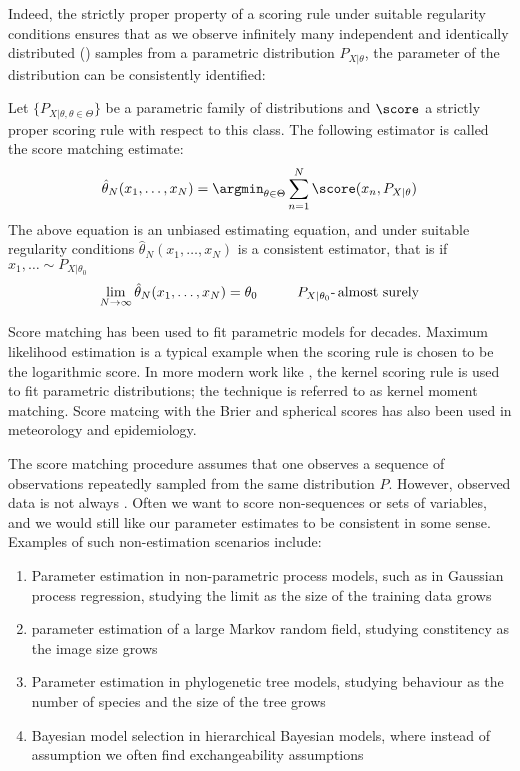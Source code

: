 Indeed, the strictly proper property of a scoring rule under suitable regularity conditions ensures that as we observe infinitely many independent and identically distributed (\iid) samples from a parametric distribution $P_{X\vert\theta}$, the parameter of the distribution can be consistently identified:

\begin{definition}
Let $\{P_{X\vert\theta, \theta\in\Theta}\}$ be a parametric family of distributions and $\score$ a strictly proper scoring rule with respect to this class. The following estimator is called the score matching estimate:
\begin{equation}
	\hat{\theta}_N(x_1,\ldots,x_N) = \argmin_{\theta\in\Theta} \sum_{n=1}^{N}\score(x_n,P_{X\vert\theta}) \label{eqn:score_matching}
\end{equation}
The above equation is an unbiased estimating equation, and under suitable regularity conditions $\hat{\theta}_N(x_1,\ldots,x_N)$ is a consistent estimator, that is if $x_1,\ldots\sim P_{X\vert\theta_0}$\iid
\begin{equation}
	\lim_{N \rightarrow \infty} \hat{\theta}_N(x_1,\ldots,x_N) = \theta_0\hspace{1cm} P_{X\vert\theta_0}\mbox{-\,almost surely}
\end{equation}
\end{definition}

Score matching has been used to fit parametric models for decades. Maximum likelihood estimation is a typical example when the scoring rule is chosen to be the logarithmic score. In more modern work like \citep{kernelmomentmatching}, the kernel scoring rule is used to fit parametric distributions; the technique is referred to as kernel moment matching. Score matcing with the Brier and spherical scores has also been used in meteorology and epidemiology.

The score matching procedure assumes that one observes a sequence of \iid observations repeatedly sampled from the same distribution $P$. However, observed data is not always \iid. Often we want to score non-\iid sequences or sets of variables, and we would still like our parameter estimates to be consistent in some sense. Examples of such non-\iid estimation scenarios include:
\begin{enumerate}
	\item Parameter estimation in non-parametric process models, such as in Gaussian process regression, studying the limit as the size of the training data grows
	\item parameter estimation of a large Markov random field, studying constitency as the image size grows
	\item Parameter estimation in phylogenetic tree models, studying behaviour as the number of species and the size of the tree grows
	\item Bayesian model selection in hierarchical Bayesian models, where instead of \iid assumption we often find exchangeability assumptions
\end{enumerate}

